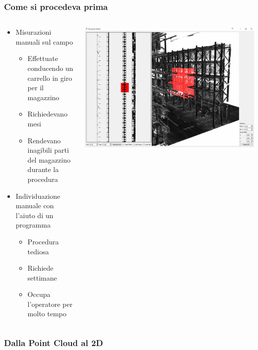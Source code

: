 \documentclass{beamer}
\begin{document}
\begin{frame}
	\frametitle{Come si procedeva prima}
	\begin{columns}
			\begin{large}
				\begin{itemize}
					\item Misurazioni manuali sul campo
					\begin{itemize}
						\item Effettuate conducendo un carrello in giro per il magazzino
						\item Richiedevano mesi
						\item Rendevano inagibili parti del magazzino durante la procedura
					\end{itemize}
					\item Individuazione manuale con l'aiuto di un programma
					\begin{itemize}
						\item Procedura tediosa
						\item Richiede settimane
						\item Occupa l'operatore per molto tempo
					\end{itemize}
				\end{itemize}
			\end{large}
		\includegraphics[width=\textwidth]{Img/LGV/select}
	\end{columns}
\end{frame}
\begin{frame}
	\frametitle{Dalla Point Cloud al 2D}
\end{frame}
\end{document}
